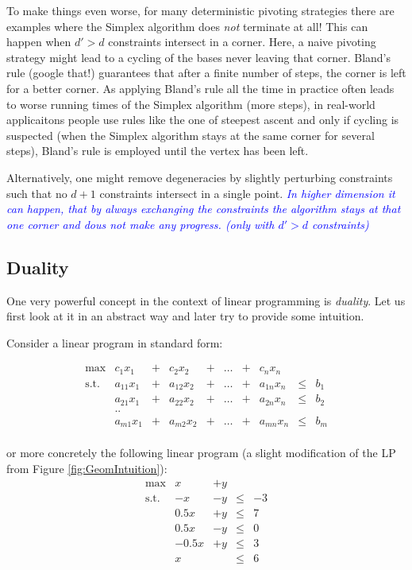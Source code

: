 \documentclass{article}
\begin{document}
To make things even worse, for many deterministic pivoting strategies there are examples where the Simplex algorithm does \emph{not} terminate at all! This can happen when $d'>d$ constraints intersect in a corner. Here, a naive pivoting strategy might lead to a cycling of the bases never leaving that corner. Bland's rule (google that!) guarantees that after a finite number of steps, the corner is left for a better corner. As applying Bland's rule all the time in practice often leads to worse running times of the Simplex algorithm (more steps), in real-world applicaitons people use rules like the one of steepest ascent and only if cycling is suspected (when the Simplex algorithm stays at the same corner for several steps), Bland's rule is employed until the vertex has been left.

Alternatively, one might remove degeneracies by slightly perturbing constraints such that no $d+1$ constraints intersect in a single point.
\textcolor{blue}{\emph{In higher dimension it can happen, that by always exchanging the constraints the algorithm stays at that one corner and dous not make any progress. (only with $d'>d$ constraints)}}

\subsection{Duality}
One very powerful concept in the context of linear programming is \emph{duality}. Let us first look at it in an abstract way and later try to provide some intuition.

Consider a linear program in standard form:

\[
\begin{matrix}
	\max	& c_1 x_1 &+& c_2 x_2 &+& \dots &+& c_n x_n&&\\  
	\mbox{s.t.}	& a_{11} x_1 &+& a_{12} x_2&+& \dots &+&a_{1n} x_n&\leq&b_1\\
			& a_{21} x_1 &+& a_{22} x_2&+& \dots &+&a_{2n} x_n&\leq&b_2\\
			& ..	&&&&&&&&\\
			& a_{m1} x_1 &+& a_{m2} x_2&+& \dots &+&a_{mn} x_n&\leq&b_m\\
\end{matrix}
\]

or more concretely the following linear program (a slight modification of the LP from Figure \ref{fig:GeomIntuition}):
\[
\begin{matrix}
	\max		& x	&+	y	&&\\ 
	\mbox{s.t.}	&-x	&	-y	&\leq&-3\\ 
			&0.5x	&	+y	&\leq&7\\ 
			&0.5x	&	-y	& \leq&0\\
			&-0.5x	&	+y	& \leq&3\\
			&	x	&		& \leq&6\\
\end{matrix}
\]
\end{document}
